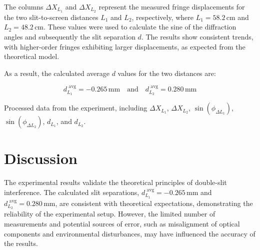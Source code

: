 \documentclass[journal]{IEEEtran}
\begin{document}
The columns $\Delta X_{L_1}$ and $\Delta X_{L_2}$ represent the measured fringe displacements for the two slit-to-screen distances $L_1$ and $L_2$, respectively, where $L_1 = 58.2 \, \text{cm}$ and $L_2 = 48.2 \, \text{cm}$. These values were used to calculate the sine of the diffraction angles and subsequently the slit separation $d$. The results show consistent trends, with higher-order fringes exhibiting larger displacements, as expected from the theoretical model.

As a result, the calculated average $d$ values for the two distances are:

\begin{equation}
    d_{L_1}^{\text{ avg}} = -0.265 \, \text{mm} \quad \text{and} \quad d_{L_2 }^{\text{ avg}} = 0.280 \, \text{mm}
    \end{equation}
    
        \begin{table}[h]
            \centering 
            \caption{Processed data from the experiment, including $\Delta X_{L_1}$, $\Delta X_{L_2}$, $\sin(\phi_{\Delta L_1})$, $\sin(\phi_{\Delta L_2})$, $d_{L_1}$, and $d_{L_2}$.}
            \label{fig:processed_data_visualization}
        \end{table}

        \section{Discussion}
        The experimental results validate the theoretical principles of double-slit interference. The calculated slit separations, \( d_{L_1}^{\text{ avg}} = -0.265 \, \text{mm} \) and \( d_{L_2}^{\text{ avg}} = 0.280 \, \text{mm} \), are consistent with theoretical expectations, demonstrating the reliability of the experimental setup. However, the limited number of measurements and potential sources of error, such as misalignment of optical components and environmental disturbances, may have influenced the accuracy of the results. 
\end{document}
